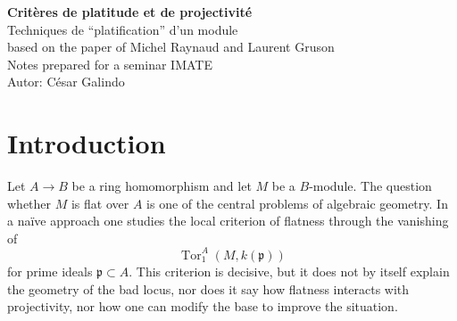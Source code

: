 \documentclass[11pt,oneside]{article}
\newcommand{\Tor}{\operatorname{Tor}}
\begin{document}
\begin{center}
  {\Large\bfseries Crit\`eres de platitude et de projectivit\'e}\\[0.4em]
  {\large Techniques de \enquote{platification} d'un module}\\[0.9em]
  {\normalsize based on the paper of Michel Raynaud and Laurent Gruson}\\[0.8em]
  {\normalsize Notes prepared for a seminar IMATE}\\[0.35em]
  {\normalsize Autor: C\'esar Galindo}
\end{center}

\begin{abstract}
These notes offer a detailed and more narrative account of the central architecture of Raynaud--Gruson's paper on flatness, projectivity, purity, universal flattening, and flattening by blow-up.  They are inspired in part by a lecture delivered by P.~Pel\'aez at IMATE.  The aim is not merely to summarize the statements, but to reorganize the main proofs into a coherent exposition for a seminar at IMATE, so that the movement from local algebra to birational geometry can be followed as a single mathematical narrative.  We explain the role of relative d\'evissage, prove the flatness criterion from the d\'evissage machine, derive the characterization of projectivity in terms of flatness and purity, establish the representability of the universal flattening condition in the local-henselian setting, and then present the proof mechanism of flattening by admissible blow-up.  Particular care is devoted to the homological meaning of universal injectivity, to the geometric role of the relative assassin, and to the way strict transform removes precisely the torsion created over the bad locus.
\end{abstract}

\tableofcontents
\setlength{\parskip}{0.35em}
\linespread{1.135}\selectfont

\section{Introduction}

Let $A\to B$ be a ring homomorphism and let $M$ be a $B$-module.  The question whether $M$ is flat over $A$ is one of the central problems of algebraic geometry.  In a na\"ive approach one studies the local criterion of flatness through the vanishing of
\[
\Tor_1^A(M,k(\mathfrak p))
\]
for prime ideals $\mathfrak p\subset A$.  This criterion is decisive, but it does not by itself explain the geometry of the bad locus, nor does it say how flatness interacts with projectivity, nor how one can modify the base to improve the situation.
\end{document}
